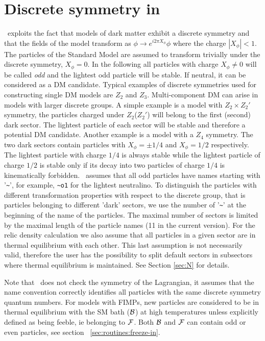\documentclass[12pt,a4paper]{article}
\begin{document}
\section{Discrete symmetry in \micro}
\label{DiscretSym}
 \micro\ exploits the fact that models of dark matter exhibit a discrete symmetry
and that the fields  of the model transform as 
$   \phi \to e^{i2\pi X_{\phi}} \phi$
where the charge $|X_{\phi}|<1$. 
The particles of the  Standard Model 
are assumed to transform trivially under the discrete symmetry, $X_\phi=0$. In the following all particles with
 charge $X_\phi\neq 0$  will be called 
 {\it odd} and the  lightest odd particle  will be  stable. If neutral, it can be considered as a DM candidate.
Typical  examples  of discrete symmetries used for constructing single DM models  are $Z_2$ and  $Z_3$. 
Multi-component DM can arise in models with larger discrete groups. A simple 
example is a model with  $Z_2\times Z_2'$ symmetry, the particles charged under  $Z_2$($Z_2'$) will belong to the first (second) dark sector. The lightest particle of each sector  will be stable and therefore a potential DM candidate. 
Another example is a model with a $Z_4$  symmetry.  The two dark sectors contain particles with $X_\phi=\pm 1/4$ and $X_\phi=1/2$ respectively. The lightest particle with  charge $1/4$ is always stable while the lightest particle of charge $1/2$ is stable only if its decay into two particles of charge $1/4$ is kinematically forbidden.
 \micro\ assumes that all odd particles have  names
starting with '\verb|~|', for example, \verb|~o1| for the lightest  
neutralino. 
To distinguish the particles with different transformation properties with 
respect to the discrete group, that is particles belonging to different 'dark' sectors,
we use the number of '\verb|~|' at the beginning of the name of the particles. The maximal number of  sectors is limited by the maximal length of the particle names (11  in the current  version). 
For the relic density calculation we also assume that all particles in a given sector are in thermal equilibrium with each other.  This last assumption is not necessarily valid, therefore   the user has the  possibility to split  default sectors  in  subsectors where thermal equilibrium is maintained. See Section \ref{sec:N} for details.  

Note that \micro\ does not check the symmetry of the Lagrangian, it assumes that the name convention 
correctly identifies  all particles with the same discrete symmetry quantum numbers.
For models with FIMPs, new particles are considered to be in thermal equilibrium with the SM bath (${\cal B}$) at high temperatures unless explicitly defined as being feeble, ie belonging to ${\cal F}$. Both ${\cal B}$ and ${\cal F}$ can contain odd or even particles, see section
~\ref{sec:routines:freeze-in}.
\end{document}
